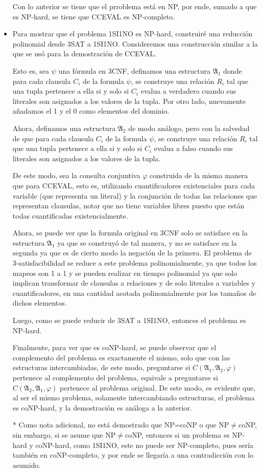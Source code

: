 \documentclass[letterpaper,10pt]{article}
\begin{document}
\begin{itemize}
    Con lo anterior se tiene que el prroblema está en NP, por ende, sumado a que es NP-hard, se tiene que CCEVAL es NP-completo.

    \item Para mostrar que el problema 1SI1NO es NP-hard, construiré una reducción polinomial desde 3SAT a 1SI1NO. Consideremos una construcción similar a la que se usó para la demostración de CCEVAL.

    Esto es, sea $\psi$ una fórmula en 3CNF, definamos una estructura $\mathfrak{A}_1$ donde para cada clausula $C_i$ de la formula $\psi$, se construye una relación $R_i$ tal que una tupla pertenece a ella si y solo si $C_i$ evalua a verdadero cuando sus literales son asignados a los valores de la tupla. Por otro lado, nuevamente añadamos el 1 y el 0 como elementos del dominio.

    Ahora, definamos una estructura $\mathfrak{A}_2$ de modo análogo, pero con la salvedad de que para cada clausula $C_i$ de la formula $\psi$, se construye una relación $R_i$ tal que una tupla pertenece a ella si y solo si $C_i$ evalua a falso cuando sus literales son asignados a los valores de la tupla.

    De este modo, sea la consulta conjuntiva $\varphi$ construida de la misma manera que para CCEVAL, esto es, utilizando cuantificadores existenciales para cada variable (que representa un literal) y la conjunción de todas las relaciones que representan clausulas, notar que no tiene variables libres puesto que están todas cuantificadas existencialmente.

    Ahora, se puede ver que la formula original en 3CNF solo se satisface en la estructura $\mathfrak{A}_1$ ya que se construyó de tal manera, y no se satisface en la segunda ya que es de cierto modo la negación de la primera. El problema de 3-satisfacibilidad se reduce a este problema polinomialmente, ya que todos los mapeos son 1 a 1 y se pueden realizar en tiempo polinomial ya que solo implican transformar de clausulas a relaciones y de solo literales a variables y cuantificadores, en una cantidad acotada polinomialmente por los tamaños de dichos elementos.

    Luego, como se puede reducir de 3SAT a 1SI1NO, entonces el problema es NP-hard.

    Finalmente, para ver que es coNP-hard, se puede observar que el complemento del problema es exactamente el mismo, solo que con las estructuras intercambiadas, de este modo, preguntarse si $C(\mathfrak{A}_1, \mathfrak{A}_2, \varphi)$ pertenece al complemento del problema, equivale a preguntarse si $C(\mathfrak{A}_2, \mathfrak{A}_1, \varphi)$ pertenece al problema original. De este modo, es evidente que, al ser el mismo problema, solamente intercambiando estructuras, el problema es coNP-hard, y la demostración es análoga a la anterior.

    * Como nota adicional, no está demostrado que NP=coNP o que NP$\neq$coNP, sin embargo, si se asume que NP$\neq$coNP, entonces si un problema es NP-hard y coNP-hard, como 1SI1NO, este no puede ser NP-completo, pues sería también en coNP-completo, y por ende se llegaría a una contradicción con lo asumido.


\end{itemize}
\end{document}
